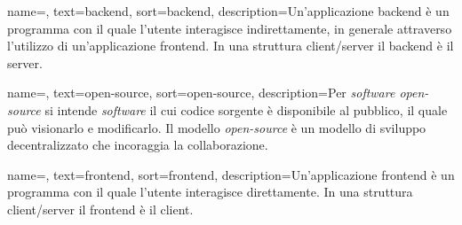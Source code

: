 {
    name=,
    text=backend,
    sort=backend,
    description={Un'applicazione backend è un programma con il quale l'utente interagisce indirettamente, in generale attraverso l'utilizzo di un'applicazione \gls{frontend}. In una struttura client/server il backend è il server.}
}

{
    name=,
    text=open-source,
    sort=open-source,
    description={Per \emph{software open-source} si intende \emph{software} il cui codice sorgente è disponibile al pubblico, il quale può visionarlo e modificarlo. Il modello \emph{open-source} è un modello di sviluppo decentralizzato che incoraggia la collaborazione.}
}

{
    name=,
    text=frontend,
    sort=frontend,
    description={Un'applicazione frontend è un programma con il quale l'utente interagisce direttamente. In una struttura client/server il frontend è il client.}
}
